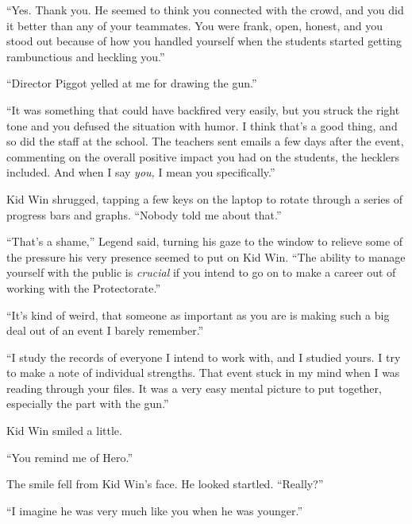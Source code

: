 ``Yes.  Thank you.  He seemed to think you connected with the crowd, and you did it better than any of your teammates. You were frank, open, honest, and you stood out because of how you handled yourself when the students started getting rambunctious and heckling you.''



``Director Piggot yelled at me for drawing the gun.''



``It was something that could have backfired very easily, but you struck the right tone and you defused the situation with humor.  I think that's a good thing, and so did the staff at the school.  The teachers sent emails a few days after the event, commenting on the overall positive impact you had on the students, the hecklers included.  And when I say \emph{you, }I mean you specifically.''



Kid Win shrugged, tapping a few keys on the laptop to rotate through a series of progress bars and graphs.  ``Nobody told me about that.''



``That's a shame,'' Legend said, turning his gaze to the window to relieve some of the pressure his very presence seemed to put on Kid Win.  ``The ability to manage yourself with the public is \emph{crucial} if you intend to go on to make a career out of working with the Protectorate.''



``It's kind of weird, that someone as important as you are is making such a big deal out of an event I barely remember.''



``I study the records of everyone I intend to work with, and I studied yours.  I try to make a note of individual strengths.  That event stuck in my mind when I was reading through your files.  It was a very easy mental picture to put together, especially the part with the gun.''



Kid Win smiled a little.



``You remind me of Hero.''



The smile fell from Kid Win's face.  He looked startled.  ``Really?''



``I imagine he was very much like you when he was younger.''



